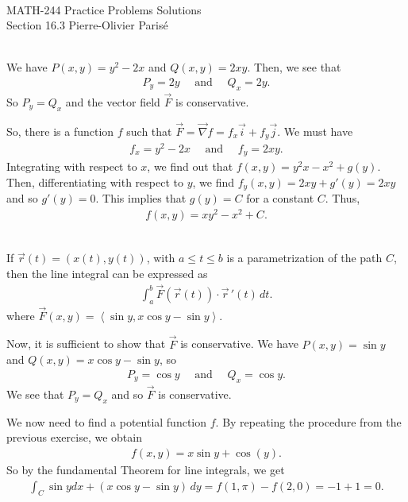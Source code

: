 


	\noindent \hrulefill \\
	MATH-244 \semester \hfill Practice Problems Solutions\\
	Section 16.3 \hfill Pierre-Olivier Paris{\'e} \\\vspace*{-1cm}
	
	\noindent\hrulefill
	
	\spc	

	\\
	We have $P (x, y) = y^2 - 2x$ and $Q(x, y) = 2xy$. Then, we see that
		\begin{align*}
		P_y = 2y \quad \text{ and } \quad Q_x = 2y .
		\end{align*}
	So $P_y = Q_x$ and the vector field $\vec{F}$ is conservative.
	
	So, there is a function $f$ such that $\vec{F} = \vec{\nabla} f = f_x \vec{i} + f_y \vec{j}$. We must have
		\begin{align*}
		f_x = y^2 - 2x \quad \text{ and } \quad f_y = 2xy .
		\end{align*}
	Integrating with respect to $x$, we find out that $f(x, y) = y^2x - x^2 + g(y)$. Then, differentiating with respect to $y$, we find $f_y (x, y) = 2xy + g'(y) = 2xy$ and so $g'(y) = 0$. This implies that $g(y) = C$ for a constant $C$. Thus,
		\begin{align*}
		f(x, y) = xy^2 - x^2 + C. 
		\end{align*}
		
	\spc
	
	\\
	If $\vec{r}(t) = (x(t) , y(t))$, with $a \leq t \leq b$ is a parametrization of the path $C$, then the line integral can be expressed as
		\begin{align*}
		\int_a^b \vec{F} (\vec{r}(t)) \cdot \vec{r}\,' (t) \, dt .
		\end{align*}
	where $\vec{F} (x, y) = \left\langle \sin y , x \cos y - \sin y \right\rangle$.
	
	Now, it is sufficient to show that $\vec{F}$ is conservative. We have $P(x, y) = \sin y$ and $Q (x, y) = x \cos y - \sin y$, so
		\begin{align*}
		P_y = \cos y \quad \text{ and } \quad Q_x = \cos y .
		\end{align*}
	We see that $P_y = Q_x$ and so $\vec{F}$ is conservative. 
	
	We now need to find a potential function $f$. By repeating the procedure from the previous exercise, we obtain
		\begin{align*}
		f(x, y) = x \sin y + \cos (y) .
		\end{align*}
	So by the fundamental Theorem for line integrals, we get
		\begin{align*}
		\int_C \sin y dx + (x \cos y - \sin y) \, dy = f(1, \pi ) - f(2, 0) = -1 + 1 = 0 .
		\end{align*}



